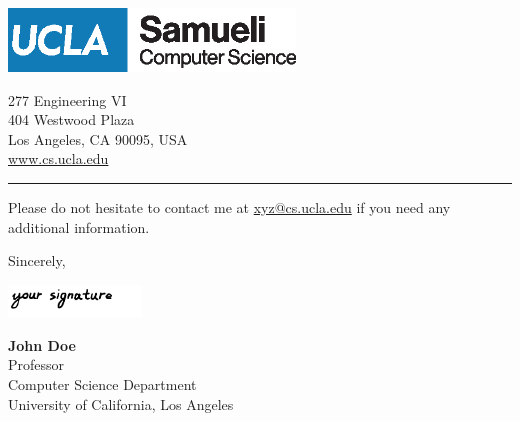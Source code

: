 \documentclass[12pt, a4paper, hidelinks]{letter} %
\begin{document}
\begin{minipage}{0.6\textwidth}
\vspace{-17mm}
\includegraphics[width=3in]{asset/UCLA_CS.eps}\\
\end{minipage}
\hfill
\begin{minipage}{0.3\textwidth}\raggedright
\vspace{-20mm}
\footnotesize{
277 Engineering VI\\
404 Westwood Plaza\\
Los Angeles, CA 90095, USA \\
\url{www.cs.ucla.edu}}
\end{minipage}
\hrule
\vspace{3mm}
\rightline{\today}





Please do not hesitate to contact me at \href{mailto:xyz@cs.ucla.edu}{xyz@cs.ucla.edu} if you need any additional information.

\vspace{+2mm}
Sincerely,


\includegraphics[width=1.4in]{asset/signature.png}

\textbf{John Doe}\\
Professor\\
Computer Science Department \\
University of California, Los Angeles
\end{document}
